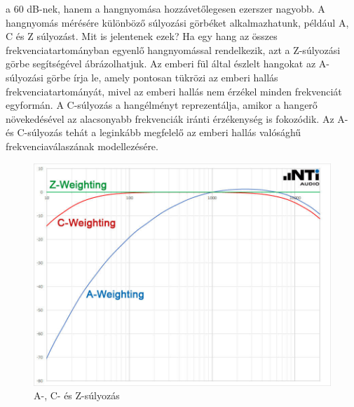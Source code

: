 a 60 dB-nek, hanem a hangnyomása hozzávetőlegesen ezerszer nagyobb. A hangnyomás mérésére 
különböző súlyozási görbéket alkalmazhatunk, például A, C és Z súlyozást. Mit is jelentenek 
ezek? Ha egy hang az összes frekvenciatartományban egyenlő hangnyomással rendelkezik, azt a 
Z-súlyozási görbe segítségével ábrázolhatjuk. Az emberi fül által észlelt hangokat az 
A-súlyozási görbe írja le, amely pontosan tükrözi az emberi hallás frekvenciatartományát, mivel 
az emberi hallás nem érzékel minden frekvenciát egyformán. A C-súlyozás a hangélményt 
reprezentálja, amikor a hangerő növekedésével az alacsonyabb frekvenciák iránti érzékenység is 
fokozódik. Az A- és C-súlyozás tehát a leginkább megfelelő az emberi hallás valósághű 
frekvenciaválaszának modellezésére.
\begin{figure}[H]
	\centering
	\includegraphics[width=\linewidth, keepaspectratio]{figures/db_weights.jpg}
    \caption{A-, C- és Z-súlyozás~\cite{DBWEIGHTS}}\label{fig:db_weights}
\end{figure}
\newpage
